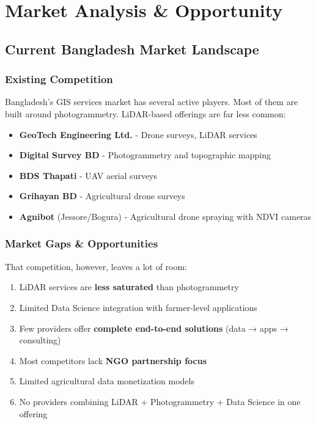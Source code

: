 
\chapter{Market Analysis \& Opportunity}

\section{Current Bangladesh Market Landscape}

\subsection{Existing Competition}

Bangladesh's GIS services market has several active players. Most of them are built around photogrammetry. LiDAR-based offerings are far less common:

\begin{itemize}
    \item \textbf{GeoTech Engineering Ltd.} - Drone surveys, LiDAR services
    \item \textbf{Digital Survey BD} - Photogrammetry and topographic mapping
    \item \textbf{BDS Thapati} - UAV aerial surveys
    \item \textbf{Grihayan BD} - Agricultural drone surveys
    \item \textbf{Agnibot} (Jessore/Bogura) - Agricultural drone spraying with NDVI cameras
\end{itemize}

\subsection{Market Gaps \& Opportunities}

That competition, however, leaves a lot of room:

\begin{enumerate}
    \item LiDAR services are \textcolor{AccentGreen}{\textbf{less saturated}} than photogrammetry
    \item Limited Data Science integration with farmer-level applications
    \item Few providers offer \textcolor{AccentGreen}{\textbf{complete end-to-end solutions}} (data → apps → consulting)
    \item Most competitors lack \textcolor{AccentGreen}{\textbf{NGO partnership focus}}
    \item Limited agricultural data monetization models
    \item No providers combining LiDAR + Photogrammetry + Data Science in one offering
\end{enumerate}


